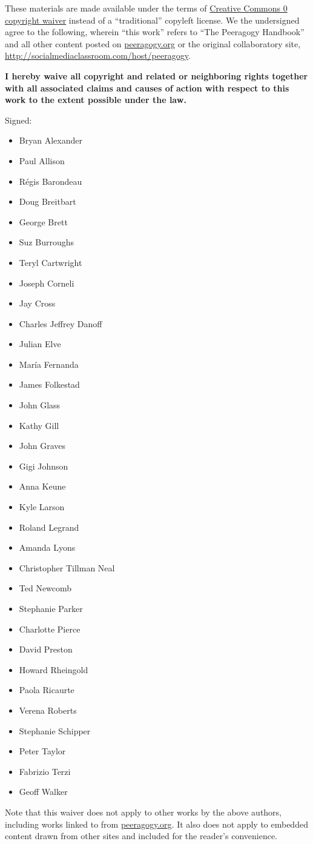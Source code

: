 These materials are made available under the terms of
\href{http://creativecommons.org/publicdomain/zero/1.0/}{Creative
Commons 0 copyright waiver} instead of a ``traditional'' copyleft
license. We the undersigned agree to the following, wherein ``this
work'' refers to ``The Peeragogy Handbook'' and all other content posted
on \href{http://peeragogy.org}{peeragogy.org} or the original
collaboratory site,
\href{http://socialmediaclassroom.com/host/peeragogy}{http://socialmediaclassroom.com/host/peeragogy}.

\bigskip
\textbf{I hereby waive all copyright and related or neighboring rights
together with all associated claims and causes of action with respect to
this work to the extent possible under the law.}

\bigskip
Signed:

\begin{itemize}
\item
  Bryan Alexander
\item
  Paul Allison
\item
  Régis Barondeau
\item
  Doug Breitbart
\item
  George Brett
\item
  Suz Burroughs
\item
  Teryl Cartwright
\item
  Joseph Corneli
\item
  Jay Cross
\item
  Charles Jeffrey Danoff
\item
  Julian Elve
\item
  María Fernanda
\item
  James Folkestad
\item
  John Glass
\item
  Kathy Gill
\item
  John Graves
\item
  Gigi Johnson
\item
  Anna Keune
\item
  Kyle Larson
\item
  Roland Legrand
\item
  Amanda Lyons
\item
  Christopher Tillman Neal
\item
  Ted Newcomb
\item
  Stephanie Parker
\item
  Charlotte Pierce
\item
  David Preston
\item
  Howard Rheingold
\item
  Paola Ricaurte
\item
  Verena Roberts
\item
  Stephanie Schipper
\item
  Peter Taylor
\item
  Fabrizio Terzi
\item
  Geoff Walker
\end{itemize}
Note that this waiver does not apply to other works by the above
authors, including works linked to from
\href{http://peeragogy.org}{peeragogy.org}. It also does not apply to
embedded content drawn from other sites and included for the reader's
convenience.

